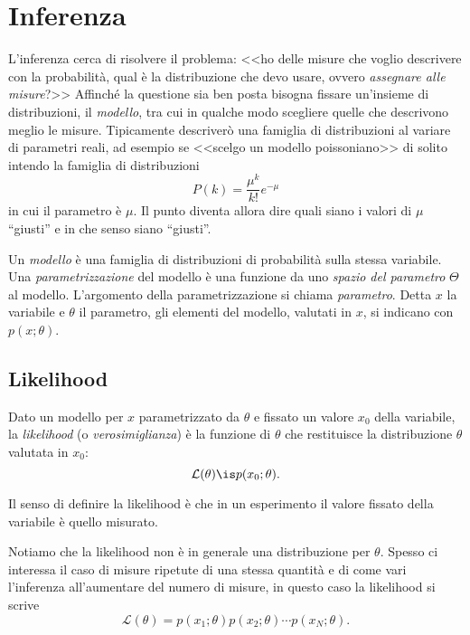\chapter{Inferenza}

L'inferenza cerca di risolvere il problema:
<<ho delle misure che voglio descrivere con la probabilità,
qual è la distribuzione che devo usare, ovvero \emph{assegnare alle misure}?>>
Affinché la questione sia ben posta bisogna fissare un'insieme di distribuzioni, il \emph{modello},
tra cui in qualche modo scegliere quelle che descrivono meglio le misure.
Tipicamente descriverò una famiglia di distribuzioni al variare di parametri reali,
ad esempio se <<scelgo un modello poissoniano>> di solito intendo la famiglia di distribuzioni
\begin{equation*}
	P(k) = \frac{\mu^k}{k!}e^{-\mu}
\end{equation*}
in cui il parametro è $\mu$.
Il punto diventa allora dire quali siano i valori di $\mu$ ``giusti'' e in che senso siano ``giusti''.

\begin{definition}[Modello]
	Un \emph{modello} è una famiglia di distribuzioni di probabilità sulla stessa variabile.
	Una \emph{parametrizzazione} del modello è una funzione
	da uno \emph{spazio del parametro} $\Theta$
	al modello.
	L'argomento della parametrizzazione si chiama \emph{parametro}.
	Detta $x$ la variabile e $\theta$ il parametro,
	gli elementi del modello, valutati in $x$, si indicano con $p(x;\theta)$.
\end{definition}

\section{Likelihood}

\begin{definition}[Likelihood]
	Dato un modello per $x$ parametrizzato da $\theta$
	e fissato un valore $x_0$ della variabile,
	la \emph{likelihood} (o \emph{verosimiglianza}) è la funzione di $\theta$
	che restituisce la distribuzione $\theta$ valutata in $x_0$:
	\begin{equation*}
		\mathcal L(\theta) \is p(x_0;\theta).
	\end{equation*}
\end{definition}

Il senso di definire la likelihood
è che in un esperimento il valore fissato della variabile è quello misurato.

Notiamo che la likelihood non è in generale una distribuzione per $\theta$.
Spesso ci interessa il caso di misure ripetute di una stessa quantità e di come vari l'inferenza all'aumentare del numero di misure, in questo caso la likelihood si scrive
\begin{equation*}
	\mathcal L(\theta) = p(x_1;\theta) p(x_2;\theta) \dotsm p(x_N;\theta).
\end{equation*}

